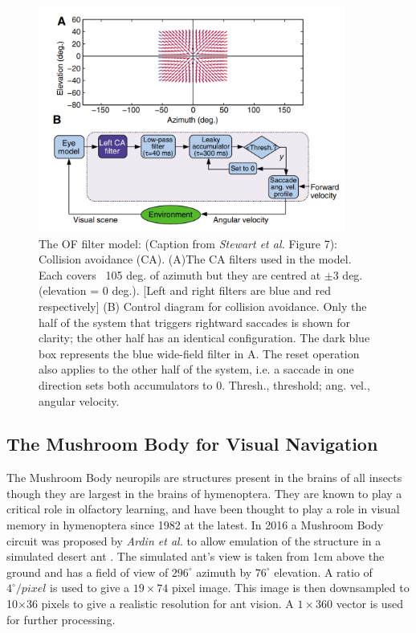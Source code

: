 \documentclass[a4paper,11pt,twoside,openright]{article}
\begin{document}
\begin{figure}[h]
 
  \centering
  \includegraphics[width=0.9\textwidth]{Stewart2010CAModel}
  \caption{
    \label{fig:stewartca} The OF filter model: (Caption from \textit{Stewart et al.} Figure 7):
    Collision avoidance (CA). (A)The CA filters used in the
    model. Each covers ~105 deg. of azimuth but they are centred
    at $\pm 3$ deg. (elevation = 0 deg.). [Left and right filters
    are blue and red respectively] (B) Control diagram for collision
    avoidance. Only the half of the system that triggers rightward
    saccades is shown for clarity; the other half has an identical
    configuration. The dark blue box represents the blue wide-field
    filter in A. The reset operation also applies to the other half of
    the system, i.e. a saccade in one direction sets both
    accumulators to 0. Thresh., threshold; ang. vel., angular velocity.
  }
 
\end{figure}

\subsection{ The Mushroom Body for Visual Navigation } \label{MBBackground}
The Mushroom Body neuropils are structures present in the brains of all insects though they are
largest in the brains of hymenoptera. They are known to play a critical role in olfactory
learning, and have been thought to play a role in visual memory in hymenoptera since 1982
at the latest\cite{Mobbs1982}. In 2016 a Mushroom Body circuit was proposed by \textit{Ardin et al.}
to allow emulation of the structure in a simulated desert ant \cite{Ardin2016}. The simulated
ant's view is taken from 1cm above the ground and has a field of view of $296^{\circ}$ azimuth
by $76^{\circ}$ elevation. A ratio of $4^{\circ}/pixel$ is used to give a $19\times74$ pixel image.
This image is then downsampled to 10$\times$36 pixels to give a realistic resolution for ant vision.
A $1\times360$ vector is used for further processing.
\newline
\end{document}
